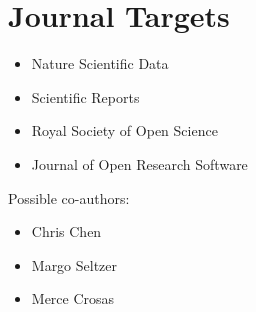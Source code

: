 \documentclass{article}
\begin{document}
\section*{Journal Targets}

\begin{itemize}
\item Nature Scientific Data
\item Scientific Reports
\item Royal Society of Open Science
\item Journal of Open Research Software
\end{itemize}

Possible co-authors:

\begin{itemize}
\item Chris Chen
\item Margo Seltzer
\item Merce Crosas
\end{itemize}
\end{document}
